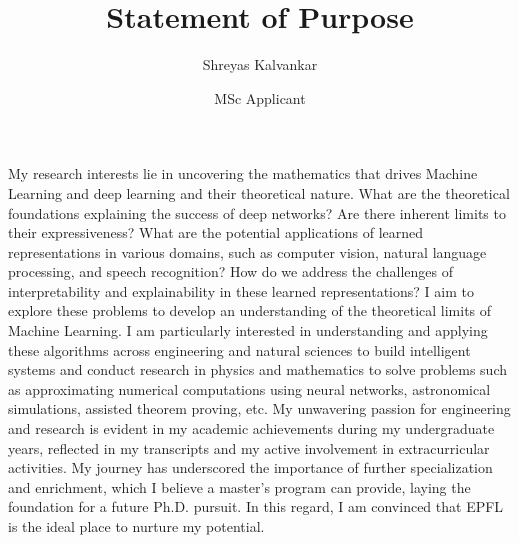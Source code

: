 \documentclass{article}
\title{Statement of Purpose}
\author{Shreyas Kalvankar}
\date{MSc Applicant}
\begin{document}
  \maketitle%
  \thispagestyle{empty}
\vspace{3pt}
\hspace{0.25in}My research interests lie in uncovering the mathematics that
drives Machine Learning and deep learning and their theoretical nature. What are
the theoretical foundations explaining the success of deep networks? Are there
inherent limits to their expressiveness? What are the potential applications of
learned representations in various domains, such as computer vision, natural
language processing, and speech recognition? How do we address the challenges of
interpretability and explainability in these learned representations? I aim to
explore these problems to develop an understanding of the theoretical limits of
Machine Learning. I am particularly interested in understanding and applying
these algorithms across engineering and natural sciences to build intelligent
systems and conduct research in physics and mathematics to solve problems such
as approximating numerical computations using neural networks, astronomical
simulations, assisted theorem proving, etc. My unwavering passion for
engineering and research is evident in my academic achievements during my
undergraduate years, reflected in my transcripts and my active involvement in
extracurricular activities. My journey has underscored the importance of further
specialization and enrichment, which I believe a master's program can provide,
laying the foundation for a future Ph.D. pursuit. In this regard, I am convinced
that EPFL is the ideal place to nurture my potential.
\vspace{3pt}
\end{document}
